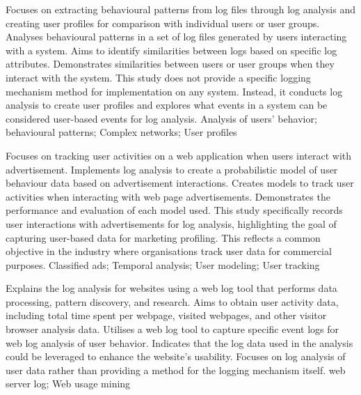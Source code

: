 {
    Focuses on extracting behavioural patterns from log files through log analysis and creating user profiles for comparison with individual users or user groups.
}
{
    Analyses behavioural patterns in a set of log files generated by users interacting with a system. Aims to identify similarities between logs based on specific log attributes.
}
{
    Demonstrates similarities between users or user groups when they interact with the system.
}
{
    This study does not provide a specific logging mechanism method for implementation on any system. Instead, it conducts log analysis to create user profiles and explores what events in a system can be considered user-based events for log analysis.
}
{
    Analysis of users' behavior; behavioural patterns; Complex networks; User profiles
}

{
    Focuses on tracking user activities on a web application when users interact with advertisement. Implements log analysis to create a probabilistic model of user behaviour data based on advertisement interactions.
}
{
    Creates models to track user activities when interacting with web page advertisements.
}
{
    Demonstrates the performance and evaluation of each model used.
}
{
    This study specifically records user interactions with advertisements for log analysis, highlighting the goal of capturing user-based data for marketing profiling. This reflects a common objective in the industry where organisations track user data for commercial purposes.
}
{
    Classified ads; Temporal analysis; User modeling; User tracking
}

{
    Explains the log analysis for websites using a web log tool that performs data processing, pattern discovery, and research. Aims to obtain user activity data, including total time spent per webpage, visited webpages, and other visitor browser analysis data.
}
{
    Utilises a web log tool to capture specific event logs for web log analysis of user behavior.
}
{
    Indicates that the log data used in the analysis could be leveraged to enhance the website's usability.
}
{
    Focuses on log analysis of user data rather than providing a method for the logging mechanism itself.
}
{
    web server log; Web usage mining
}